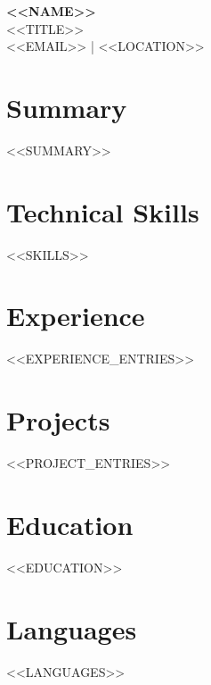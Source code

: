 \documentclass[11pt,a4paper]{article}
\begin{document}

{\LARGE\bfseries <<NAME>>} \\[4pt]
{\color{gray600} <<TITLE>>} \\[2pt]
{\small <<EMAIL>> \quad | \quad <<LOCATION>>}

\vspace{8pt}

\section{Summary}
<<SUMMARY>>

\section{Technical Skills}
<<SKILLS>>

\section{Experience}
<<EXPERIENCE_ENTRIES>>

\section{Projects}
<<PROJECT_ENTRIES>>

\section{Education}
<<EDUCATION>>

\section{Languages}
<<LANGUAGES>>
\end{document}
